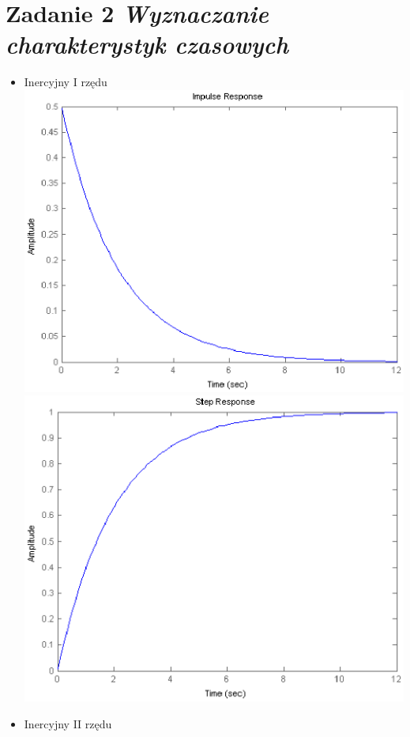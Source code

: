 \documentclass[a4paper,10pt]{article}
\begin{document}
\section{Zadanie 2 \textit{\small Wyznaczanie charakterystyk czasowych}}\label{sec:zad2}

\begin{itemize}
\item Inercyjny I rzędu
\newline \includegraphics[scale=0.8]{CW1-inercyjny1-impuls.eps}
\newline \includegraphics[scale=0.8]{CW1-inercyjny1-skok.eps}
\item Inercyjny II rzędu

\end{itemize}
\end{document}
